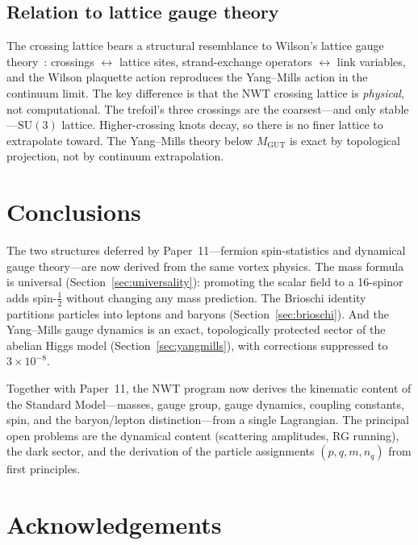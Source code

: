 \documentclass[11pt]{article}
\newcommand{\half}{\tfrac{1}{2}}
\begin{document}
\subsection{Relation to lattice gauge theory}

The crossing lattice bears a structural resemblance to Wilson's
lattice gauge theory~\cite{Wilson1974}: crossings $\leftrightarrow$
lattice sites, strand-exchange operators $\leftrightarrow$ link
variables, and the Wilson plaquette action reproduces the
Yang--Mills action in the continuum limit.  The key difference is
that the NWT crossing lattice is \emph{physical}, not computational.
The trefoil's three crossings are the coarsest---and only
stable---$\mathrm{SU}(3)$ lattice.  Higher-crossing knots decay,
so there is no finer lattice to extrapolate toward.  The Yang--Mills
theory below $M_\text{GUT}$ is exact by topological projection, not
by continuum extrapolation.


\section{Conclusions}
\label{sec:conclusions}

The two structures deferred by Paper~11---fermion spin-statistics and
dynamical gauge theory---are now derived from the same vortex physics.
The mass formula is universal (Section~\ref{sec:universality}):
promoting the scalar field to a 16-spinor adds spin-$\half$ without
changing any mass prediction.  The Brioschi identity partitions
particles into leptons and baryons (Section~\ref{sec:brioschi}).
And the Yang--Mills gauge dynamics is an exact, topologically
protected sector of the abelian Higgs model
(Section~\ref{sec:yangmills}), with corrections suppressed to
$3 \times 10^{-8}$.

Together with Paper~11, the NWT program now derives the kinematic
content of the Standard Model---masses, gauge group, gauge dynamics,
coupling constants, spin, and the baryon/lepton distinction---from a
single Lagrangian.  The principal open problems are the dynamical
content (scattering amplitudes, RG running), the dark sector, and
the derivation of the particle assignments $(p,q,m,n_q)$ from
first principles.

\section*{Acknowledgements}
\end{document}
